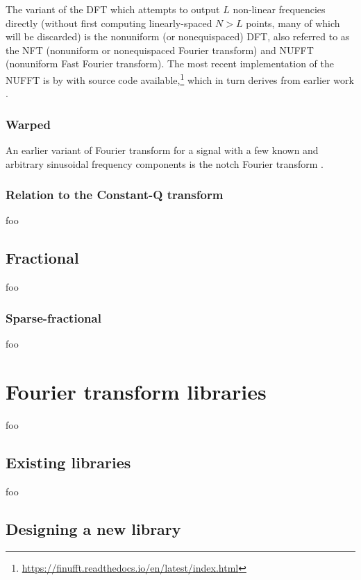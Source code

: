 \documentclass[letter,12pt]{article}
\begin{document}
The variant of the DFT which attempts to output $L$ non-linear frequencies directly (without first computing linearly-spaced $N > L$ points, many of which will be discarded) is the nonuniform (or nonequispaced) DFT, also referred to as the NFT (nonuniform or nonequispaced Fourier transform) and NUFFT (nonuniform Fast Fourier transform). The most recent implementation of the NUFFT is by \citet{nufft1} with source code available,\footnote{\href{https://finufft.readthedocs.io/en/latest/index.html}{https://finufft.readthedocs.io/en/latest/index.html}} which in turn derives from earlier work \cite{nufft2, nufft3}.

\subsubsection{Warped}

An earlier variant of Fourier transform for a signal with a few known and arbitrary sinusoidal frequency components is the notch Fourier transform \cite{notch}.

\subsubsection{Relation to the Constant-Q transform}

foo

\subsection{Fractional}

foo

\subsubsection{Sparse-fractional}

foo

\section{Fourier transform libraries}

foo

\subsection{Existing libraries}

foo

\subsection{Designing a new library}
\end{document}
